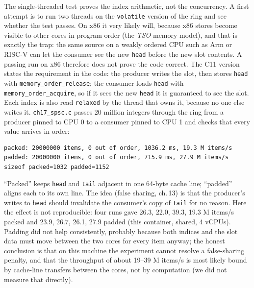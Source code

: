 

\begin{example}
The single-threaded test proves the index arithmetic, not the
concurrency. A first attempt is to run two threads on the
\texttt{volatile} version of the ring and see whether the test
passes. On x86 it very likely will, because x86 stores become visible
to other cores in program order (the \emph{TSO} memory model), and
that is exactly the trap: the same source on a weakly ordered CPU such
as Arm or RISC-V can let the consumer see the new \texttt{head} before
the new slot contents. A passing run on x86 therefore does not prove
the code correct. The C11 version states the requirement in the
code: the producer writes the slot, then stores \texttt{head} with
\texttt{memory\_order\_release}; the consumer loads \texttt{head} with
\texttt{memory\_order\_acquire}, so if it sees the new \texttt{head}
it is guaranteed to see the slot. Each index is also read
\texttt{relaxed} by the thread that owns it, because no one else writes it.
\texttt{ch17\_spsc.c} passes 20 million integers through the ring
from a producer pinned to CPU 0 to a consumer pinned to CPU 1 and
checks that every value arrives in order:

{\scriptsize
\begin{verbatim}
packed: 20000000 items, 0 out of order, 1036.2 ms, 19.3 M items/s
padded: 20000000 items, 0 out of order, 715.9 ms, 27.9 M items/s
sizeof packed=1032 padded=1152
\end{verbatim}
}
``Packed'' keeps \texttt{head} and \texttt{tail} adjacent in one
64-byte cache line; ``padded'' aligns each to its own line. The idea
(false sharing, ch.\,13) is that the producer's writes to
\texttt{head} should invalidate the consumer's copy of \texttt{tail}
for no reason. Here the effect is not reproducible: four runs gave
26.3, 22.0, 39.3, 19.3 M items/s packed and 23.9, 26.7, 26.1, 27.9 padded (this
container, shared, 4 vCPUs). Padding did not help consistently,
probably because both indices and the slot data must move between the two
cores for every item anyway; the honest conclusion is that on this
machine the experiment cannot resolve a false-sharing penalty, and
that the throughput of about 19--39 M items/s is most
likely bound by cache-line transfers between the cores, not by computation
(we did not measure that directly).
\end{example}

